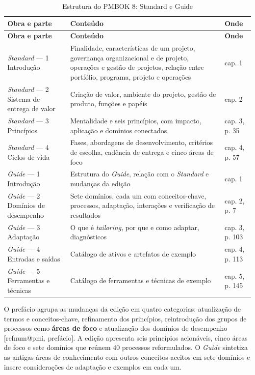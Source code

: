 \documentclass[11pt,a4paper]{article}
\makeatletter
\newcommand{\refnum}[1]{\csname refnum@#1\endcsname}
\newcommand{\cit}[1]{[\refnum{#1}]}
\newcommand{\SingleSpacing}{}
\newcommand{\fontetab}[1]{\par\vspace{3pt}{\small\noindent Fonte: #1\par}}
\makeatother
\begin{document}
\begingroup\SingleSpacing\small
\begin{longtable}{@{}>{\raggedright\arraybackslash}p{}>{\raggedright\arraybackslash}p{}>{\raggedright\arraybackslash}p{}@{}}
\caption{Estrutura do PMBOK 8: Standard e Guide}\label{tab:t1}\\
\toprule
\textbf{Obra e parte} & \textbf{Conteúdo} & \textbf{Onde}\\
\midrule
\endfirsthead
\toprule
\textbf{Obra e parte} & \textbf{Conteúdo} & \textbf{Onde}\\
\midrule
\endhead
\bottomrule
\endfoot
\bottomrule
\endlastfoot
\textit{Standard} — 1 Introdução & Finalidade, características de um projeto, governança organizacional e de projeto, operações e gestão de projetos, relação entre portfólio, programa, projeto e operações & cap. 1\\[3pt]
\textit{Standard} — 2 Sistema de entrega de valor & Criação de valor, ambiente do projeto, gestão de produto, funções e papéis & cap. 2\\[3pt]
\textit{Standard} — 3 Princípios & Mentalidade e seis princípios, com impacto, aplicação e domínios conectados & cap. 3, p. 35\\[3pt]
\textit{Standard} — 4 Ciclos de vida & Fases, abordagens de desenvolvimento, critérios de escolha, cadência de entrega e cinco áreas de foco & cap. 4, p. 57\\[3pt]
\textit{Guide} — 1 Introdução & Estrutura do \textit{Guide}, relação com o \textit{Standard} e mudanças da edição & cap. 1\\[3pt]
\textit{Guide} — 2 Domínios de desempenho & Sete domínios, cada um com conceitos-chave, processos, adaptação, interações e verificação de resultados & cap. 2, p. 7\\[3pt]
\textit{Guide} — 3 Adaptação & O que é \textit{tailoring}, por que e como adaptar, diagnósticos & cap. 3, p. 103\\[3pt]
\textit{Guide} — 4 Entradas e saídas & Catálogo de ativos e artefatos de exemplo & cap. 4, p. 113\\[3pt]
\textit{Guide} — 5 Ferramentas e técnicas & Catálogo de ferramentas e técnicas de exemplo & cap. 5, p. 145\\[3pt]
\end{longtable}
\endgroup
\fontetab{Elaborado pelos autores (2026), com base em \cit{pmi}.}

O prefácio agrupa as mudanças da edição em quatro categorias: atualização de termos e conceitos-chave, refinamento dos princípios, reintrodução dos grupos de processos como \textbf{áreas de foco} e atualização dos domínios de desempenho [\refnum{pmi}, prefácio]. A edição apresenta seis princípios acionáveis, cinco áreas de foco e sete domínios que reúnem 40 processos reformulados. O \textit{Guide} sintetiza as antigas áreas de conhecimento com outros conceitos aceitos em sete domínios e insere considerações de adaptação e exemplos em cada um.
\end{document}
